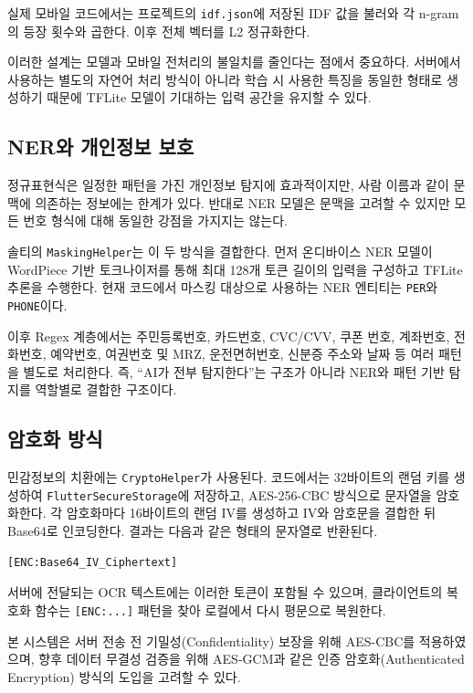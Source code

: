 \documentclass[11pt,a4paper]{article}
\begin{document}
실제 모바일 코드에서는 프로젝트의 \texttt{idf.json}에 저장된 IDF 값을 불러와 각 n-gram의 등장 횟수와 곱한다. 이후 전체 벡터를 L2 정규화한다.

이러한 설계는 모델과 모바일 전처리의 불일치를 줄인다는 점에서 중요하다. 서버에서 사용하는 별도의 자연어 처리 방식이 아니라 학습 시 사용한 특징을 동일한 형태로 생성하기 때문에 TFLite 모델이 기대하는 입력 공간을 유지할 수 있다.

\subsection{NER와 개인정보 보호}

정규표현식은 일정한 패턴을 가진 개인정보 탐지에 효과적이지만, 사람 이름과 같이 문맥에 의존하는 정보에는 한계가 있다. 반대로 NER 모델은 문맥을 고려할 수 있지만 모든 번호 형식에 대해 동일한 강점을 가지지는 않는다.

솔티의 \texttt{MaskingHelper}는 이 두 방식을 결합한다. 먼저 온디바이스 NER 모델이 WordPiece 기반 토크나이저를 통해 최대 128개 토큰 길이의 입력을 구성하고 TFLite 추론을 수행한다. 현재 코드에서 마스킹 대상으로 사용하는 NER 엔티티는 \texttt{PER}와 \texttt{PHONE}이다.

이후 Regex 계층에서는 주민등록번호, 카드번호, CVC/CVV, 쿠폰 번호, 계좌번호, 전화번호, 예약번호, 여권번호 및 MRZ, 운전면허번호, 신분증 주소와 날짜 등 여러 패턴을 별도로 처리한다. 즉, ``AI가 전부 탐지한다''는 구조가 아니라 NER와 패턴 기반 탐지를 역할별로 결합한 구조이다.

\subsection{암호화 방식}

민감정보의 치환에는 \texttt{CryptoHelper}가 사용된다. 코드에서는 32바이트의 랜덤 키를 생성하여 \texttt{FlutterSecureStorage}에 저장하고, AES-256-CBC 방식으로 문자열을 암호화한다. 각 암호화마다 16바이트의 랜덤 IV를 생성하고 IV와 암호문을 결합한 뒤 Base64로 인코딩한다. 결과는 다음과 같은 형태의 문자열로 반환된다.

\begin{lstlisting}
[ENC:Base64_IV_Ciphertext]
\end{lstlisting}

서버에 전달되는 OCR 텍스트에는 이러한 토큰이 포함될 수 있으며, 클라이언트의 복호화 함수는 \texttt{[ENC:...]} 패턴을 찾아 로컬에서 다시 평문으로 복원한다.

본 시스템은 서버 전송 전 기밀성(Confidentiality) 보장을 위해 AES-CBC를 적용하였으며, 향후 데이터 무결성 검증을 위해 AES-GCM과 같은 인증 암호화(Authenticated Encryption) 방식의 도입을 고려할 수 있다.
\end{document}
